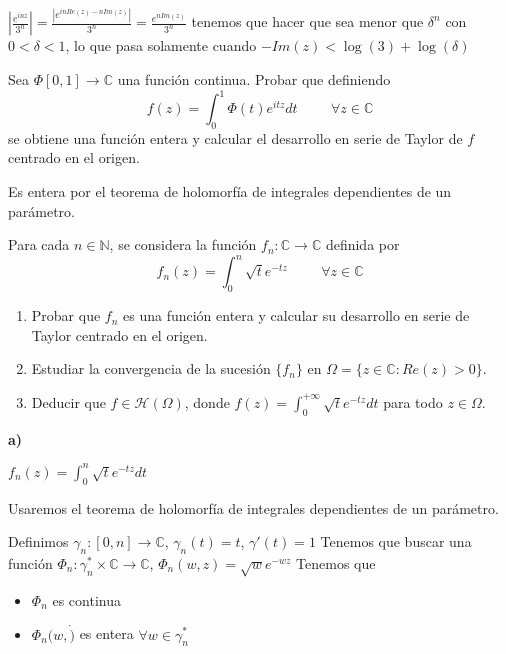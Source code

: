 $\left| \frac{e^{inz}}{3^n} \right| = \frac{|e^{inRe(z)-nIm(z)}|}{3^n} = \frac{e^{nIm(z)}}{3^n}$
tenemos que hacer que sea menor que $\delta^n$ con $0<\delta<1$, lo que pasa solamente cuando $-Im(z) < \log(3)+\log(\delta)$


\begin{ejer}
	Sea $\Phi [0,1]\rightarrow\mathbb{C}$ una función continua. Probar que definiendo
	$$ f(z) = \int_{0}^{1} \Phi(t)e^{itz}dt \hspace{1cm} \forall z\in\mathbb{C} $$
	se obtiene una función entera y calcular el desarrollo en serie de Taylor de $f$ centrado en el origen.
\end{ejer}
Es entera por el teorema de holomorfía de integrales dependientes de un parámetro.




\begin{ejer}
	Para cada $n\in\mathbb{N}$, se considera la función $f_n:\mathbb{C}\rightarrow\mathbb{C}$ definida por
	$$ f_n(z) = \int_{0}^{n} \sqrt{t}e^{-tz} \hspace{1cm} \forall z\in\mathbb{C} $$
	\begin{enumerate}[label=\alph*)]
		\item Probar que $f_n$ es una función entera y calcular su desarrollo en serie de Taylor centrado en el origen.
		\item Estudiar la convergencia de la sucesión $\{f_n\}$ en $\Omega = \{ z\in\mathbb{C} : Re(z)>0 \}$.
		\item Deducir que $f\in\mathcal{H}(\Omega)$, donde $f(z) = \int_{0}^{+\infty} \sqrt{t}e^{-tz}dt$ para todo $z\in\Omega$.
	\end{enumerate}
\end{ejer}

\textbf{a)}

$f_n(z) = \int_0^n \sqrt{t}e^{-tz}dt$

Usaremos el teorema de holomorfía de integrales dependientes de un parámetro.

Definimos
$\gamma_n :[0,n] \rightarrow \mathbb{C}$, $\gamma_n(t)=t$, $\gamma'(t) = 1$
Tenemos que buscar una función $\Phi_n : \gamma_n^{\ast}\times\mathbb{C} \rightarrow \mathbb{C}$, $\Phi_n(w,z) = \sqrt{w}e^{-wz}$
Tenemos que
\begin{itemize}
	\item $\Phi_n$ es continua
	\item $\Phi_n(w,\dot)$ es entera $\forall w\in\gamma_n^{\ast}$
\end{itemize}

